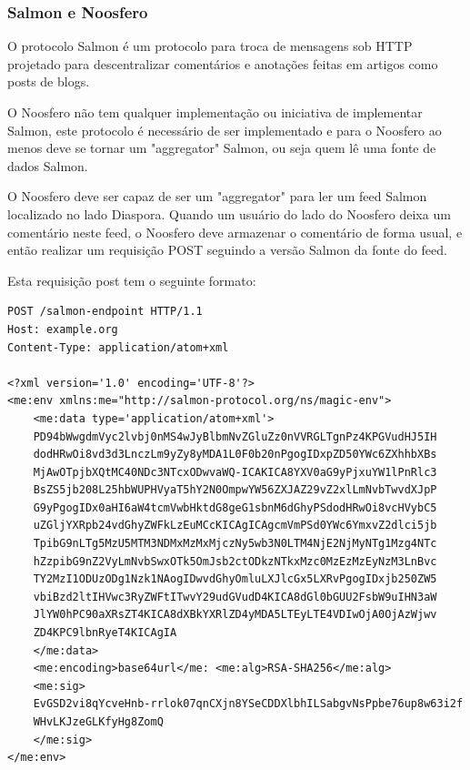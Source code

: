 \documentclass[12pt]{article}
\begin{document}
\subsubsection{Salmon e Noosfero}

O protocolo Salmon é um protocolo para troca de mensagens sob HTTP projetado
para descentralizar comentários e anotações feitas em artigos como posts de
blogs.

O Noosfero não tem qualquer implementação ou iniciativa de implementar Salmon,
este protocolo é necessário de ser implementado e para o Noosfero ao menos
deve se tornar um "aggregator" Salmon, ou seja quem lê uma fonte de dados
Salmon.

O Noosfero deve ser capaz de ser um "aggregator" para ler um feed Salmon
localizado no lado Diaspora. Quando um usuário do lado do Noosfero deixa um
comentário neste feed, o Noosfero deve armazenar o comentário de forma usual,
e então realizar um requisição POST\cite{salmon} seguindo a versão Salmon da fonte do feed.

Esta requisição post tem o seguinte formato:

\begin{framed}
\begin{lstlisting}[caption=Exemplo requisição POST Salmon]
POST /salmon-endpoint HTTP/1.1
Host: example.org
Content-Type: application/atom+xml

<?xml version='1.0' encoding='UTF-8'?>
<me:env xmlns:me="http://salmon-protocol.org/ns/magic-env">
    <me:data type='application/atom+xml'>
    PD94bWwgdmVyc2lvbj0nMS4wJyBlbmNvZGluZz0nVVRGLTgnPz4KPGVudHJ5IH
    dodHRwOi8vd3d3LnczLm9yZy8yMDA1L0F0b20nPgogIDxpZD50YWc6ZXhhbXBs
    MjAwOTpjbXQtMC40NDc3NTcxODwvaWQ-ICAKICA8YXV0aG9yPjxuYW1lPnRlc3
    BsZS5jb208L25hbWUPHVyaT5hY2N0OmpwYW56ZXJAZ29vZ2xlLmNvbTwvdXJpP
    G9yPgogIDx0aHI6aW4tcmVwbHktdG8geG1sbnM6dGhyPSdodHRwOi8vcHVybC5
    uZGljYXRpb24vdGhyZWFkLzEuMCcKICAgICAgcmVmPSd0YWc6YmxvZ2dlci5jb
    TpibG9nLTg5MzU5MTM3NDMxMzMxMjczNy5wb3N0LTM4NjE2NjMyNTg1Mzg4NTc
    hZzpibG9nZ2VyLmNvbSwxOTk5OmJsb2ctODkzNTkxMzc0MzEzMzEyNzM3LnBvc
    TY2MzI1ODUzODg1Nzk1NAogIDwvdGhyOmluLXJlcGx5LXRvPgogIDxjb250ZW5
    vbiBzd2ltIHVwc3RyZWFtITwvY29udGVudD4KICA8dGl0bGUU2FsbW9uIHN3aW
    JlYW0hPC90aXRsZT4KICA8dXBkYXRlZD4yMDA5LTEyLTE4VDIwOjA0OjAzWjwv
    ZD4KPC9lbnRyeT4KICAgIA
    </me:data>
    <me:encoding>base64url</me: <me:alg>RSA-SHA256</me:alg>
    <me:sig>
    EvGSD2vi8qYcveHnb-rrlok07qnCXjn8YSeCDDXlbhILSabgvNsPpbe76up8w63i2f
    WHvLKJzeGLKfyHg8ZomQ
    </me:sig>
</me:env>
\end{lstlisting}
\end{framed}
\end{document}
